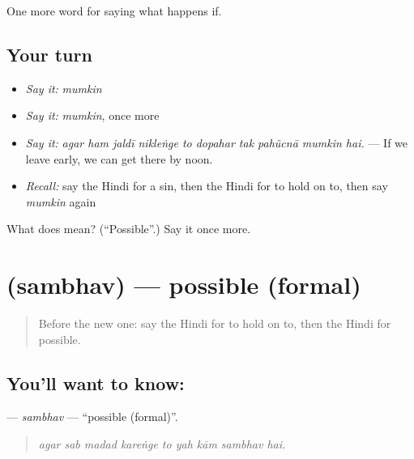\begin{grammarlens}[title={What you've built}]
One more word for saying what happens if.
\end{grammarlens}

\subsection*{Your turn}
\begin{itemize}
\raggedright
  \item \emph{Say it:} \emph{mumkin}
  \item \emph{Say it:} \emph{mumkin}, once more
  \item \emph{Say it:} \emph{agar ham jaldī nikleṅge to dopahar tak pahũcnā mumkin hai.} — If we leave early, we can get there by noon.
  \item \emph{Recall:} say the Hindi for a sin, then the Hindi for to hold on to, then say \emph{mumkin} again
\end{itemize}

\begin{tcolorbox}[breakable,colback=teal!4,colframe=teal!35!black,title={Before you move on}]
What does  mean? (\textquotedblleft{}Possible\textquotedblright{}.) Say it once more.
\end{tcolorbox}
\section[\texorpdfstring{\hi{संभव} (sambhav)}{संभव (sambhav)}]{ (sambhav) — possible (formal)}

\label{lesson:HI-C373-sambhav}



\begin{quote}
Before the new one: say the Hindi for to hold on to, then the Hindi for possible.
\end{quote}

\subsection*{You'll want to know: }
\textbf{} — \emph{sambhav} — \textquotedblleft{}possible (formal)\textquotedblright{}.

\begin{quote}
        
\end{quote}

\begin{quote}
\emph{agar sab madad kareṅge to yah kām sambhav hai.}
\end{quote}

